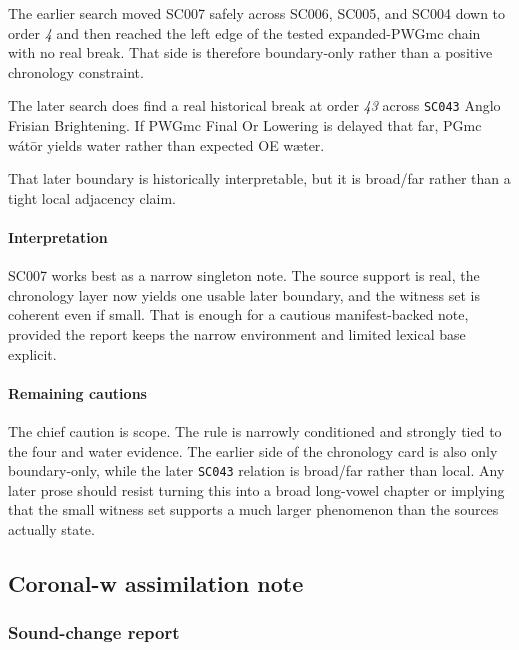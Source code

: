 \documentclass[
  british,
  a4paper,
]{article}
\begin{document}
The earlier search moved SC007 safely across SC006, SC005, and SC004
down to order \emph{4} and then reached the left edge of the tested
expanded-PWGmc chain with no real break. That side is therefore
boundary-only rather than a positive chronology constraint.

The later search does find a real historical break at order \emph{43}
across \texttt{SC043} Anglo Frisian Brightening. If PWGmc Final Or
Lowering is delayed that far, PGmc wátōr yields water rather than
expected OE wæter.

That later boundary is historically interpretable, but it is broad/far
rather than a tight local adjacency claim.

\paragraph{Interpretation}\label{interpretation-4}

SC007 works best as a narrow singleton note. The source support is real,
the chronology layer now yields one usable later boundary, and the
witness set is coherent even if small. That is enough for a cautious
manifest-backed note, provided the report keeps the narrow environment
and limited lexical base explicit.

\paragraph{Remaining cautions}\label{remaining-cautions-4}

The chief caution is scope. The rule is narrowly conditioned and
strongly tied to the four and water evidence. The earlier side of the
chronology card is also only boundary-only, while the later
\texttt{SC043} relation is broad/far rather than local. Any later prose
should resist turning this into a broad long-vowel chapter or implying
that the small witness set supports a much larger phenomenon than the
sources actually state.

\subsection{Coronal-w assimilation
note}\label{coronal-w-assimilation-note}

\subsubsection{Sound-change report}\label{sound-change-report-5}
\end{document}
